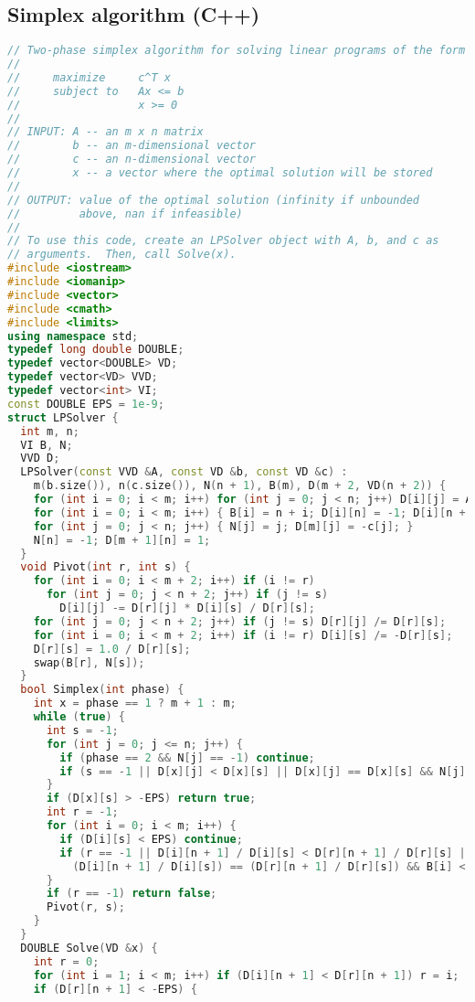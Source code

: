 \subsection{Simplex algorithm (C++)}
\begin{lstlisting}[language=C++]
// Two-phase simplex algorithm for solving linear programs of the form
//
//     maximize     c^T x
//     subject to   Ax <= b
//                  x >= 0
//
// INPUT: A -- an m x n matrix
//        b -- an m-dimensional vector
//        c -- an n-dimensional vector
//        x -- a vector where the optimal solution will be stored
//
// OUTPUT: value of the optimal solution (infinity if unbounded
//         above, nan if infeasible)
//
// To use this code, create an LPSolver object with A, b, and c as
// arguments.  Then, call Solve(x).
#include <iostream>
#include <iomanip>
#include <vector>
#include <cmath>
#include <limits>
using namespace std;
typedef long double DOUBLE;
typedef vector<DOUBLE> VD;
typedef vector<VD> VVD;
typedef vector<int> VI;
const DOUBLE EPS = 1e-9;
struct LPSolver {
  int m, n;
  VI B, N;
  VVD D;
  LPSolver(const VVD &A, const VD &b, const VD &c) :
    m(b.size()), n(c.size()), N(n + 1), B(m), D(m + 2, VD(n + 2)) {
    for (int i = 0; i < m; i++) for (int j = 0; j < n; j++) D[i][j] = A[i][j];
    for (int i = 0; i < m; i++) { B[i] = n + i; D[i][n] = -1; D[i][n + 1] = b[i]; }
    for (int j = 0; j < n; j++) { N[j] = j; D[m][j] = -c[j]; }
    N[n] = -1; D[m + 1][n] = 1;
  }
  void Pivot(int r, int s) {
    for (int i = 0; i < m + 2; i++) if (i != r)
      for (int j = 0; j < n + 2; j++) if (j != s)
        D[i][j] -= D[r][j] * D[i][s] / D[r][s];
    for (int j = 0; j < n + 2; j++) if (j != s) D[r][j] /= D[r][s];
    for (int i = 0; i < m + 2; i++) if (i != r) D[i][s] /= -D[r][s];
    D[r][s] = 1.0 / D[r][s];
    swap(B[r], N[s]);
  }
  bool Simplex(int phase) {
    int x = phase == 1 ? m + 1 : m;
    while (true) {
      int s = -1;
      for (int j = 0; j <= n; j++) {
        if (phase == 2 && N[j] == -1) continue;
        if (s == -1 || D[x][j] < D[x][s] || D[x][j] == D[x][s] && N[j] < N[s]) s = j;
      }
      if (D[x][s] > -EPS) return true;
      int r = -1;
      for (int i = 0; i < m; i++) {
        if (D[i][s] < EPS) continue;
        if (r == -1 || D[i][n + 1] / D[i][s] < D[r][n + 1] / D[r][s] ||
          (D[i][n + 1] / D[i][s]) == (D[r][n + 1] / D[r][s]) && B[i] < B[r]) r = i;
      }
      if (r == -1) return false;
      Pivot(r, s);
    }
  }
  DOUBLE Solve(VD &x) {
    int r = 0;
    for (int i = 1; i < m; i++) if (D[i][n + 1] < D[r][n + 1]) r = i;
    if (D[r][n + 1] < -EPS) {

\end{lstlisting}
